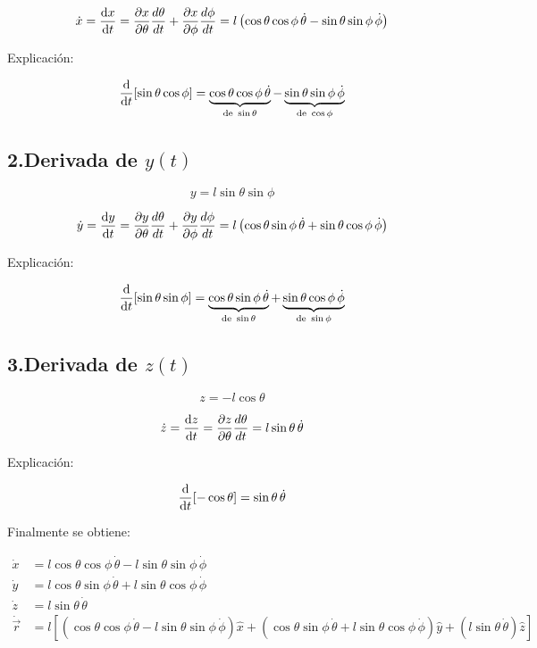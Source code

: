 \documentclass[12pt]{article}
\begin{document}
\[
\dot{x} = \dv{x}{t} = \frac{\partial x}{\partial \theta}\frac{d\theta}{dt} +  \frac{\partial x}{\partial \phi}\frac{d\phi}{dt}= l \left( \cos\theta \cos\phi \, \dot{\theta} - \sin\theta \sin\phi \, \dot{\phi} \right)
\]

Explicación:

\[
\dv{}{t}[\sin\theta \cos\phi] = 
\underbrace{\cos\theta \cos\phi \, \dot{\theta}}_{\text{de } \sin\theta}
-
\underbrace{\sin\theta \sin\phi \, \dot{\phi}}_{\text{de } \cos\phi}
\]

\subsection*{2.Derivada de \(y(t)\)}

\[
y = l \sin\theta \sin\phi
\]

\[
\dot{y} = \dv{y}{t} =\frac{\partial y}{\partial \theta}\frac{d\theta}{dt} +  \frac{\partial y}{\partial \phi}\frac{d\phi}{dt} = l \left( \cos\theta \sin\phi \, \dot{\theta} + \sin\theta \cos\phi \, \dot{\phi} \right)
\]

Explicación:

\[
\dv{}{t}[\sin\theta \sin\phi] = 
\underbrace{\cos\theta \sin\phi \, \dot{\theta}}_{\text{de } \sin\theta}
+
\underbrace{\sin\theta \cos\phi \, \dot{\phi}}_{\text{de } \sin\phi}
\]

\subsection*{3.Derivada de \(z(t)\)}

\[
z = -l \cos\theta
\]

\[
\dot{z} = \dv{z}{t} = \frac{\partial z}{\partial \theta}\frac{d\theta}{dt} = l \sin\theta \, \dot{\theta}
\]

Explicación:

\[
\dv{}{t}[-\cos\theta] = \sin\theta \, \dot{\theta}
\]

Finalmente se obtiene:

\begin{equation}
\begin{aligned}
\dot{x} &= l \cos\theta \cos\phi \, \dot{\theta} - l \sin\theta \sin\phi \, \dot{\phi} \\
\dot{y} &= l \cos\theta \sin\phi \, \dot{\theta} + l \sin\theta \cos\phi \, \dot{\phi} \\
\dot{z} &= l \sin\theta \, \dot{\theta} \\
\dot \vec {r} &= l [(\cos\theta \cos\phi \, \dot{\theta} - l \sin\theta \sin\phi \, \dot{\phi})\hat{x} +
			(\cos\theta \sin\phi \, \dot{\theta} + l \sin\theta \cos\phi \, \dot{\phi})\hat{y} +
			( l \sin\theta \, \dot{\theta})\hat{z}]
\end{aligned}
\label{Eq2}
\end{equation}
\end{document}

